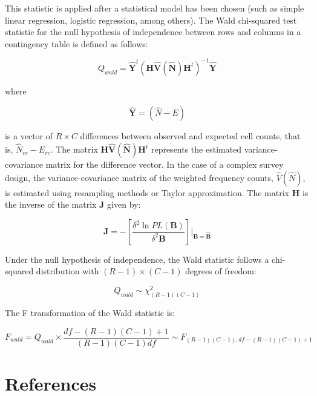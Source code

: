 \documentclass[
  12pt,
]{book}
\begin{document}
This statistic is applied after a statistical model has been chosen (such as simple linear regression, logistic regression, among others). The Wald chi-squared test statistic for the null hypothesis of independence between rows and columns in a contingency table is defined as follows:

\[
Q_{wald} = \hat{\boldsymbol{Y}}^{t} \left(\boldsymbol{H} \hat{\boldsymbol{V}} \left(\hat{\boldsymbol{N}}\right) \boldsymbol{H}^{t}\right)^{-1} \hat{\boldsymbol{Y}}
\]

where

\[
\hat{\boldsymbol{Y}} = \left(\hat{N} - E\right)
\]

is a vector of \(R \times C\) differences between observed and expected cell counts, that is, \(\hat{N}_{rc} - E_{rc}\). The matrix \(\boldsymbol{H} \hat{\boldsymbol{V}} \left(\hat{\boldsymbol{N}}\right) \boldsymbol{H}^{t}\) represents the estimated variance-covariance matrix for the difference vector. In the case of a complex survey design, the variance-covariance matrix of the weighted frequency counts, \(\hat{V} \left(\hat{N}\right)\), is estimated using resampling methods or Taylor approximation. The matrix \(\boldsymbol{H}\) is the inverse of the matrix \(\boldsymbol{J}\) given by:

\[
\boldsymbol{J} = -\left[\frac{\delta^{2} \ln PL\left(\boldsymbol{B}\right)}{\delta^{2} \boldsymbol{B}}\right] \bigg|_{\boldsymbol{B} = \hat{\boldsymbol{B}}}
\]

Under the null hypothesis of independence, the Wald statistic follows a chi-squared distribution with \((R-1) \times (C-1)\) degrees of freedom:

\[
Q_{wald} \sim \chi^{2}_{(R-1)(C-1)}
\]

The F transformation of the Wald statistic is:

\[
F_{wald} = Q_{wald} \times \frac{df - (R-1)(C-1) + 1}{(R-1)(C-1) df} \sim F_{(R-1)(C-1), df - (R-1)(C-1) + 1}
\]

\hypertarget{references}{%
\chapter*{References}\label{references}}

  
\end{document}
